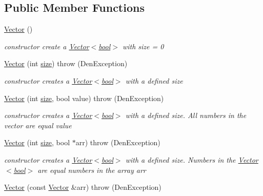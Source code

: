 \subsection*{Public Member Functions}
\begin{DoxyCompactItemize}
\item 
\mbox{\label{classVector_3_01bool_01_4_af047ef99ecd696a68c9d2897b7a61ef0}} 
\hyperlink{classVector_3_01bool_01_4_af047ef99ecd696a68c9d2897b7a61ef0}{Vector} ()
\begin{DoxyCompactList}\small\item\em constructor  create a \hyperlink{classVector_3_01bool_01_4}{Vector$<$bool$>$} with size = 0 \end{DoxyCompactList}\item 
\hyperlink{classVector_3_01bool_01_4_ad097ece2d95bca611f81522a6cd2f054}{Vector} (int \hyperlink{classVector_3_01bool_01_4_acb9a245334b171ea1ad0d9bda20da76e}{size})  throw (\+Den\+Exception)
\begin{DoxyCompactList}\small\item\em constructor  creates a \hyperlink{classVector_3_01bool_01_4}{Vector$<$bool$>$} with a defined size \end{DoxyCompactList}\item 
\hyperlink{classVector_3_01bool_01_4_a1c11bbbd5699e7abaa5a4baf80e51efe}{Vector} (int \hyperlink{classVector_3_01bool_01_4_acb9a245334b171ea1ad0d9bda20da76e}{size}, bool value)  throw (\+Den\+Exception)
\begin{DoxyCompactList}\small\item\em constructor  creates a \hyperlink{classVector_3_01bool_01_4}{Vector$<$bool$>$} with a defined size. All numbers in the vector are equal value \end{DoxyCompactList}\item 
\hyperlink{classVector_3_01bool_01_4_ae05a09ad6a197974abbf6ed0e07289b9}{Vector} (int \hyperlink{classVector_3_01bool_01_4_acb9a245334b171ea1ad0d9bda20da76e}{size}, bool $\ast$arr)  throw (\+Den\+Exception)
\begin{DoxyCompactList}\small\item\em constructor  creates a \hyperlink{classVector_3_01bool_01_4}{Vector$<$bool$>$} with a defined size. Numbers in the \hyperlink{classVector_3_01bool_01_4}{Vector$<$bool$>$} are equal numbers in the array arr \end{DoxyCompactList}\item 
\hyperlink{classVector_3_01bool_01_4_a2dff535956e32681b2fa7772123d8a62}{Vector} (const \hyperlink{classVector}{Vector} \&arr)  throw (\+Den\+Exception)

\end{DoxyCompactItemize}
